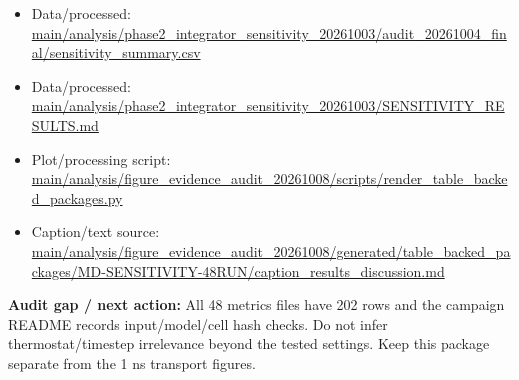 \documentclass[10pt]{article}
\newcommand{\statusline}[1]{\colorbox{gray!12}{\parbox{0.96\linewidth}{#1}}}
\begin{document}
\begin{itemize}[leftmargin=1.4em,noitemsep]
\item Data/processed: \begingroup\scriptsize\url{main/analysis/phase2_integrator_sensitivity_20261003/audit_20261004_final/sensitivity_summary.csv}\endgroup
\item Data/processed: \begingroup\scriptsize\url{main/analysis/phase2_integrator_sensitivity_20261003/SENSITIVITY_RESULTS.md}\endgroup
\item Plot/processing script: \begingroup\scriptsize\url{main/analysis/figure_evidence_audit_20261008/scripts/render_table_backed_packages.py}\endgroup
\item Caption/text source: \begingroup\scriptsize\url{main/analysis/figure_evidence_audit_20261008/generated/table_backed_packages/MD-SENSITIVITY-48RUN/caption_results_discussion.md}\endgroup
\end{itemize}
\statusline{\textbf{Audit gap / next action:} All 48 metrics files have 202 rows and the campaign README records input/model/cell hash checks. Do not infer thermostat/timestep irrelevance beyond the tested settings. Keep this package separate from the 1 ns transport figures.}
\vfill
\clearpage
\end{document}
